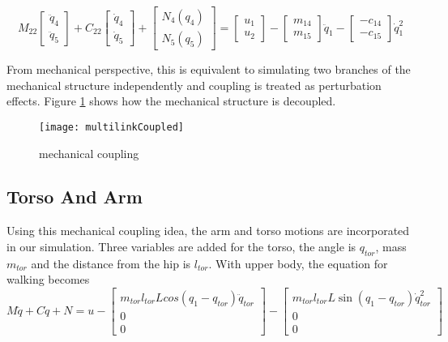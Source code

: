 {\[
M_{22}\left[\begin{array}{c}
\ddot{q}_{4}\\
\ddot{q}_{5}\end{array}\right]+C_{22}\left[\begin{array}{c}
\dot{q}_{4}\\
\dot{q}_{5}\end{array}\right]+\left[\begin{array}{c}
N_{4}(q_{4})\\
N_{5}(q_{5})\end{array}\right]=\left[\begin{array}{c}
u_{1}\\
u_{2}\end{array}\right]-\left[\begin{array}{c}
m_{14}\\
m_{15}\end{array}\right]\ddot{q}_{1}-\left[\begin{array}{c}
-c_{14}\\
-c_{15}\end{array}\right]\dot{q}_{1}^{2}
\]

From mechanical perspective, this is equivalent to simulating two branches of the mechanical structure independently and coupling is treated as perturbation effects.
Figure \ref{fig:mechcouple} shows how the mechanical structure is decoupled.
\begin{figure}[!htbp]
  \begin{center}
      \texttt{[image: multilinkCoupled]}
    \caption{mechanical coupling}
    \label{fig:mechcouple}
\end{center}
\end{figure}








\subsection{Torso And Arm}
Using this mechanical coupling idea, the arm and torso motions are incorporated in our simulation.
Three variables are added for the torso, the angle is $q_{tor}$,  mass $m_{tor}$ and the distance from the hip is $l_{tor}$.
With upper body, the equation for walking becomes
\begin{equation}
\label{eq:walkcouplewithtorso}
M\ddot{q}+C\dot{q}+N=u-\left[\begin{array}{c}
m_{tor}l_{tor}Lcos(q_{1}-q_{tor})\ddot{q}_{tor}\\
0\\
0\end{array}\right]-\left[\begin{array}{c}
m_{tor}l_{tor}L\sin(q_{1}-q_{tor})\dot{q}_{tor}^{2}\\
0\\
0\end{array}\right]
\end{equation}

}
